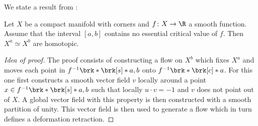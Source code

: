 % 


We state a result from \cite[Satz 4.1]{Braess1974}:
\begin{lemma}
  \label{le:Morse_homotopicNoCP}
  Let $X$ be a compact manifold with corners and $f\colon X\to\R$ a smooth function.
  Assume that the interval $[a,b]$ contains no essential critical value of $f$.
  Then $X^a\simeq X^b$ are homotopic.
\end{lemma}
\begin{proof}[Idea of proof]
  The proof consists of constructing a flow on $X^b$ which fixes $X^a$ and moves each point in $f^{-1}\brk*{\brk[s]*{a,b}}$ onto $f^{-1}\brk*{\brk[c]*{a}}$.
  For this one first constructs a smooth vector field $v$ locally around a point $x\in f^{-1}\brk*{\brk[s]*{a,b}}$ such that locally $u\cdot v =-1$ and $v$ does not point out of $X$.
  A global vector field with this property is then constructed with a smooth partition of unity.
  This vector field is then used to generate a flow which in turn defines a deformation retraction.
\end{proof}

